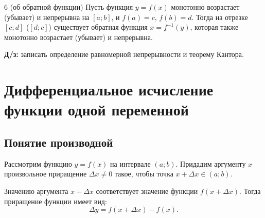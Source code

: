 \documentclass[a4paper,11pt]{article}
\begin{document}
\begin{teor}{6 (об обратной функции)}
  Пусть функция $y = f(x)$ монотонно возрастает (убывает) и непрерывна на $[a; b]$, и $f(a) = c$,
  $f(b) = d$. Тогда на отрезке $[c; d]$ ($[d; c]$) существует обратная функция $x = f^{-1}(y)$,
  которая также монотонно возрастает (убывает) и непрерывна.
\end{teor}

\begin{hwbox}
\textbf{Д/з:} записать определение равномерной непрерывности и теорему Кантора.
\end{hwbox}

\section{Дифференциальное исчисление функции одной переменной}

\subsection{Понятие производной}

Рассмотрим функцию $y = f(x)$ на интервале $(a; b)$. Придадим аргументу $x$ произвольное приращение
$\Delta x \ne 0$ такое, чтобы точка $x + \Delta x \in (a; b)$.

Значению аргумента $x + \Delta x$ соответствует значение функции $f(x + \Delta x)$. Тогда приращение
функции имеет вид:
\[
  \Delta y = f(x + \Delta x) - f(x).
\]

\begin{center}
\end{center}
\end{document}
